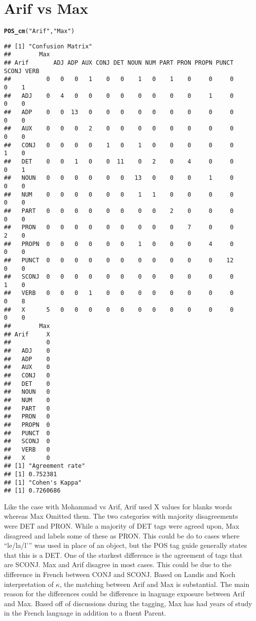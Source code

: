 \documentclass{article}\usepackage[]{graphicx}\usepackage[]{color}
\makeatletter
\newcommand{\hlstr}[1]{\textcolor[rgb]{0.192,0.494,0.8}{#1}}%
\newcommand{\hlstd}[1]{\textcolor[rgb]{0.345,0.345,0.345}{#1}}%
\newcommand{\hlkwd}[1]{\textcolor[rgb]{0.737,0.353,0.396}{\textbf{#1}}}%
\newenvironment{kframe}{%
 \def\at@end@of@kframe{}%
 \ifinner\ifhmode%
  \def\at@end@of@kframe{\end{minipage}}%
  \begin{minipage}{\columnwidth}%
 \fi\fi%
 \def\FrameCommand##1{\hskip\@totalleftmargin \hskip-\fboxsep
 \colorbox{shadecolor}{##1}\hskip-\fboxsep
     \hskip-\linewidth \hskip-\@totalleftmargin \hskip\columnwidth}%
 \MakeFramed {\advance\hsize-\width
   \@totalleftmargin\z@ \linewidth\hsize
   \@setminipage}}%
 {\par\unskip\endMakeFramed%
 \at@end@of@kframe}
\newenvironment{knitrout}{}{} %
\makeatother
\begin{document}
\section*{Arif vs Max}
\begin{knitrout}
\color{fgcolor}\begin{kframe}
\begin{alltt}
\hlkwd{POS_cm}\hlstd{(}\hlstr{"Arif"}\hlstd{,} \hlstr{"Max"}\hlstd{)}
\end{alltt}
\begin{verbatim}
## [1] "Confusion Matrix"
##        Max
## Arif       ADJ ADP AUX CONJ DET NOUN NUM PART PRON PROPN PUNCT SCONJ VERB
##          0   0   0   1    0   0    1   0    1    0     0     0     0    1
##   ADJ    0   4   0   0    0   0    0   0    0    0     1     0     0    0
##   ADP    0   0  13   0    0   0    0   0    0    0     0     0     0    0
##   AUX    0   0   0   2    0   0    0   0    0    0     0     0     0    0
##   CONJ   0   0   0   0    1   0    1   0    0    0     0     0     1    0
##   DET    0   0   1   0    0  11    0   2    0    4     0     0     0    1
##   NOUN   0   0   0   0    0   0   13   0    0    0     1     0     0    0
##   NUM    0   0   0   0    0   0    1   1    0    0     0     0     0    0
##   PART   0   0   0   0    0   0    0   0    2    0     0     0     0    0
##   PRON   0   0   0   0    0   0    0   0    0    7     0     0     2    0
##   PROPN  0   0   0   0    0   0    1   0    0    0     4     0     0    0
##   PUNCT  0   0   0   0    0   0    0   0    0    0     0    12     0    0
##   SCONJ  0   0   0   0    0   0    0   0    0    0     0     0     1    0
##   VERB   0   0   0   1    0   0    0   0    0    0     0     0     0    8
##   X      5   0   0   0    0   0    0   0    0    0     0     0     0    0
##        Max
## Arif     X
##          0
##   ADJ    0
##   ADP    0
##   AUX    0
##   CONJ   0
##   DET    0
##   NOUN   0
##   NUM    0
##   PART   0
##   PRON   0
##   PROPN  0
##   PUNCT  0
##   SCONJ  0
##   VERB   0
##   X      0
## [1] "Agreement rate"
## [1] 0.752381
## [1] "Cohen's Kappa"
## [1] 0.7260686
\end{verbatim}
\end{kframe}
\end{knitrout}
Like the case with Mohammad vs Arif, Arif used X values for blanks words whereas Max Omitted them. The two categories with majority disagreements were DET and PRON. While a majority of DET tags were agreed upon, Max disagreed and labels some of these as PRON. This could be do to cases where “le/la/l’” was used in place of an object, but the POS tag guide generally states that this is a DET. One of the starkest difference is the agreement of tags that are SCONJ. Max and Arif disagree in most cases. This could be due to the difference in French between CONJ and SCONJ. Based on Landis and Koch interpretation of $\kappa$, the matching between Arif and Max is substantial. The main reason for the differences could be difference in lnaguage exposure between Arif and Max. Based off of discussions during the tagging, Max has had years of study in the French language in addition to a fluent Parent.
\end{document}
